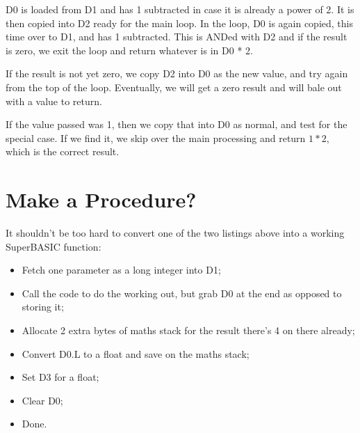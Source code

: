 D0 is loaded from D1 and has 1 subtracted in case it is already a
power of 2. It is then copied into D2 ready for the main loop. In
the loop, D0 is again copied, this time over to D1, and has 1 subtracted.
This is ANDed with D2 and if the result is zero, we exit the loop
and return whatever is in D0 {*} 2.

If the result is not yet zero, we copy D2 into D0 as the new value,
and try again from the top of the loop. Eventually, we will get a
zero result and will bale out with a value to return.

If the value passed was 1, then we copy that into D0 as normal, and
test for the special case. If we find it, we skip over the main processing
and return $1*2$, which is the correct result.

\section*{Make a Procedure?}

It shouldn't be too hard to convert one of the two listings above
into a working SuperBASIC function:
\begin{itemize}
\item Fetch one parameter as a long integer into D1;
\item Call the code to do the working out, but grab D0 at the end as opposed
to storing it;
\item Allocate 2 extra bytes of maths stack for the result \textendash{}
there's 4 on there already;
\item Convert D0.L to a float and save on the maths stack;
\item Set D3 for a float;
\item Clear D0;
\item Done.
\end{itemize}

